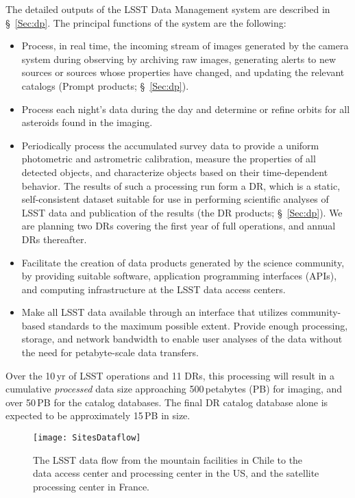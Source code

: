 The detailed outputs of the LSST Data Management system are described
in \S~\ref{Sec:dp}.  The principal functions of the system are the following:
\begin{itemize}
\item Process, in real time, the incoming stream of images generated
  by the camera system during observing by archiving raw images,
  generating alerts to new sources or sources whose properties have
  changed, and updating the relevant catalogs (Prompt  products;
  \S~\ref{Sec:dp}).
\item Process each night's data during the day and determine or refine
  orbits for all asteroids found in the imaging.
\item Periodically process the accumulated survey data to provide a
  uniform photometric and astrometric calibration, measure the
  properties of all detected objects, and characterize objects based
  on their time-dependent behavior. The results of such a processing
  run form a DR, which is a static,
  self-consistent dataset suitable for use in performing scientific
  analyses of LSST data and publication of the results (the DR
  products; \S~\ref{Sec:dp}). We are planning two DRs
  covering the first year of full operations, and annual
  DRs thereafter.
\item Facilitate the creation of data
  products generated by the science community, by providing suitable software,
  application programming interfaces (APIs),
and computing infrastructure at the LSST data access centers.
\item Make all LSST data available through an interface that utilizes
community-based standards   to the maximum possible extent. Provide
  enough processing, storage, and network bandwidth to enable user
  analyses of the data without the need for petabyte-scale data
  transfers.
\end{itemize}

Over the 10\,yr of LSST operations and 11 DRs, this processing will result in a cumulative \emph{processed} data size
approaching 500\,petabytes (PB) for imaging, and over 50\,PB for the
catalog databases. The final DR catalog database alone is expected
to be approximately 15\,PB in size.

\begin{figure*}
\hskip 0.01in
\texttt{[image: SitesDataflow]}
\caption{The LSST data flow from the mountain facilities in
Chile to the data access center and processing center in the US, and
the satellite processing center in France.}
\label{Fig:DM2}
\end{figure*}

